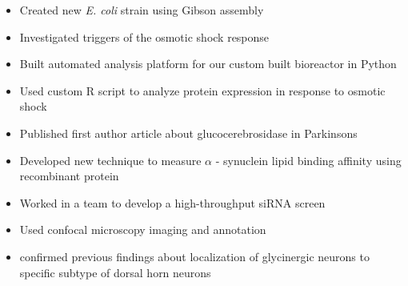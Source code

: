 \documentclass[10pt,a4paper,ragged2e,withhyper]{altacv}
\begin{document}
\begin{paracol}{2}

\par


\begin{itemize}
\item Created new \emph{E. coli} strain using Gibson assembly
\item Investigated triggers of the osmotic shock response
\item Built automated analysis platform for our custom built bioreactor in Python
\item Used custom R script to analyze protein expression in response to osmotic shock
\end{itemize}

\divider

\begin{itemize}
\item Published first author article about glucocerebrosidase in Parkinsons
\item Developed new technique to measure \( \alpha \) - synuclein lipid binding affinity using recombinant protein
\end{itemize}

\divider

\begin{itemize}
  \item Worked in a team to develop a high-throughput siRNA screen
  \end{itemize}

\divider

\begin{itemize}
  \item Used confocal microscopy imaging and annotation
  \item confirmed previous findings about localization of glycinergic neurons to specific subtype of dorsal horn neurons
  \end{itemize}

\divider
  

\end{paracol}
\end{document}

